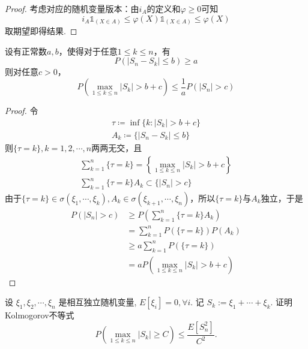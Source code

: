 \begin{proof}
    考虑对应的随机变量版本：由$i_A$的定义和$\varphi\ge 0$可知
    $$
        i_A \mathbb{1}_{(X\in A)}\le \varphi(X)\mathbb{1}_{(X\in A)}\le \varphi(X)
    $$
    取期望即得结果.
\end{proof}

\begin{theorem}
    设有正常数$a,b$，使得对于任意$1\le k\le n$，有
    \[
        P(|S_n-S_k|\le b)\ge a
    \]
    则对任意$c>0$，
    \[
        P(\max_{1\le k\le n}|S_k|> b+c)\le \frac{1}{a}P(|S_n|>c)
    \]
\end{theorem}

\begin{proof}
    令
    \begin{gather}
        \tau\coloneqq \inf\{k:|S_k|>b+c\} \label{eq:tau_def_ottaviani} \\
        A_k\coloneqq \{|S_n-S_k|\le b\} \label{eq:Ak_def_ottaviani}
    \end{gather}
    则$\{\tau =k\},k=1,2,\cdots,n$两两无交，且
    \begin{gather}
        \sum_{k=1}^n \{\tau =k\}=\left\{\max_{1\le k\le n}|S_k|>b+c\right\}\\
        \sum_{k=1}^n \{\tau =k\}A_k\subset \{|S_n|>c\}
    \end{gather}
    由于$\{\tau=k\}\in\sigma(\xi_1,\cdots,\xi_k),A_k\in\sigma(\xi_{k+1},\cdots,\xi_n)$，所以$\{\tau=k\}$与$A_k$独立，于是
    \begin{align*}
        P(|S_n|>c) & \ge P(\sum_{k=1}^n \{\tau =k\}A_k)  \\
                   & = \sum_{k=1}^n P(\{\tau =k\})P(A_k) \\
                   & \ge a\sum_{k=1}^n P(\{\tau =k\})    \\
                   & =aP(\max_{1\le k\le n}|S_k|>b+c)
    \end{align*}
\end{proof}

\begin{theorem}\label{thm:kolmogorov_inequality}
    设 $\xi_1, \xi_2, \cdots, \xi_n$ 是相互独立随机变量, $E\left[\xi_i\right]=0, \forall i$. 记 $S_k:=\xi_1+\cdots+\xi_k$. 证明Kolmogorov不等式
    $$
        P\left(\max _{1 \leqslant k \leqslant n}\left|S_k\right| \geqslant C\right) \leqslant \frac{E\left[S_n^2\right]}{C^2} .
    $$
\end{theorem}

